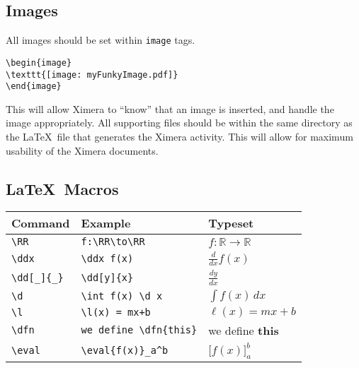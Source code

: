 \documentclass{article}
\newcommand{\RR}{\mathbb R}
\renewcommand{\d}{\,d}
\newcommand{\dd}[2][]{\frac{d #1}{d #2}}
\renewcommand{\l}{\ell}
\newcommand{\ddx}{\frac{d}{dx}}
\newcommand{\dfn}{\textbf}
\newcommand{\eval}[1]{\bigg[ #1 \bigg]}
\begin{document}
\subsection*{Images}

All images should be set within \verb|image| tags.
\begin{verbatim}
\begin{image}
\texttt{[image: myFunkyImage.pdf]}
\end{image}
\end{verbatim}
This will allow Ximera to ``know'' that an image is inserted, and
handle the image appropriately. All supporting files should be within
the same directory as the \LaTeX\ file that generates the Ximera
activity. This will allow for maximum usability of the Ximera
documents.

\subsection*{\LaTeX\ Macros}

\renewcommand{\arraystretch}{2}
\begin{tabular*}{1.0\textwidth}{lll}
\hline
Command & Example & Typeset \\
\hline
\verb|\RR| & \verb|f:\RR\to\RR| & $f:\RR\to\RR$\\ 
\verb|\ddx| & \verb|\ddx f(x)| & $\ddx f(x)$\\
\verb|\dd[_]{_}| & \verb|\dd[y]{x}| & $\dd[y]{x}$ \\
\verb|\d | & \verb|\int f(x) \d x| & $\int f(x) \d x$\\
\verb|\l| & \verb|\l(x) = mx+b| & $\l(x) = mx +b$\\
\verb|\dfn| & \verb|we define \dfn{this}| & we define \dfn{this}\\
\verb|\eval| & \verb|\eval{f(x)}_a^b| & $\eval{f(x)}_a^b$
\end{tabular*}
\end{document}
